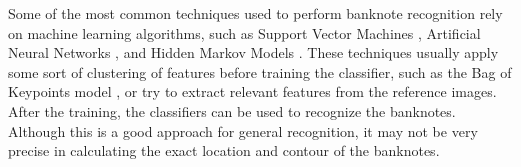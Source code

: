 Some of the most common techniques used to perform banknote recognition rely on machine learning algorithms, such as Support Vector Machines \iftoggle{ebib}{\cite{Yeh2011,Chang2007,Sun2008A}}{\cite{Yeh2011}}, Artificial Neural Networks \iftoggle{ebib}{\cite{Lee2004,Gai2013,Sun2008B}}{\cite{Gai2013}}, and Hidden Markov Models \iftoggle{ebib}{\cite{Hassanpour2009,Shan2009}}{\cite{Hassanpour2009}}. These techniques usually apply some sort of clustering of features before training the classifier, such as the Bag of Keypoints model \cite{Csurka2004}, or try to extract relevant features from the reference images. After the training, the classifiers can be used to recognize the banknotes. Although this is a good approach for general recognition, it may not be very precise in calculating the exact location and contour of the banknotes.
